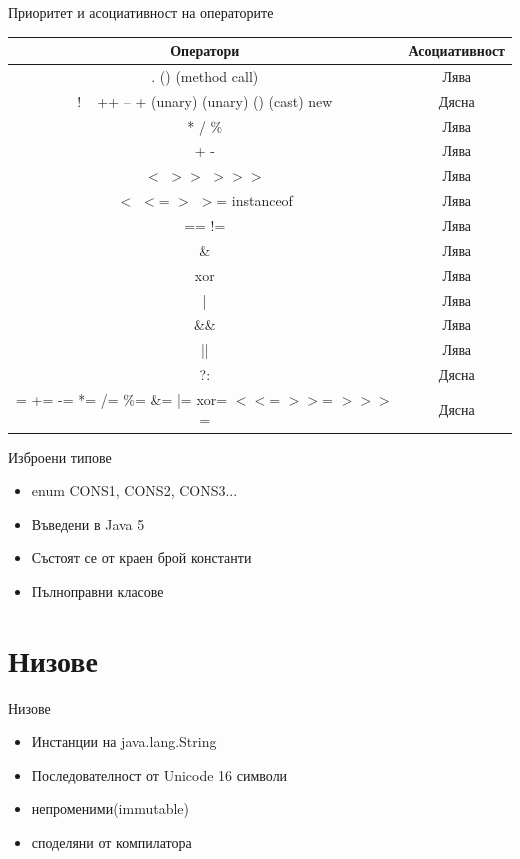 \documentclass{beamer}
\begin{document}
\begin{frame}{Приоритет и асоциативност на операторите}
  \transdissolve
\small
\begin{tabular}{|c|c|}
  \hline
  Оператори & Асоциативност \\
  \hline
  [] . () (method call) & Лява \\
  \hline
  ! ~ ++ -- + (unary) (unary) () (cast) new & Дясна \\
  \hline
  * / \% & Лява \\
  \hline
  + -   & Лява \\
  \hline
  $<$ $>$$>$ $>$$>$$>$ & Лява \\
  \hline
  $<$ $<$= $>$ $>$= instanceof & Лява \\
  \hline
  == != & Лява \\
  \hline
  \& & Лява \\
  \hline
  xor & Лява \\
  \hline
  |                                      & Лява \\
  \hline
  \&\&                                   &  Лява \\
  \hline
  ||                                   &  Лява \\
  \hline
  ?:                                  &   Дясна \\
  \hline
  = += -= *= /= \%= \&= |= xor= $<$$<$= $>$$>$= $>$$>$$>$= & Дясна \\
  \hline
\end{tabular}

\end{frame}

\begin{frame}{Изброени типове}
  \transdissolve
  \begin{itemize}
  \item enum {CONS1, CONS2, CONS3...} \pause
  \item Въведени в Java 5 \pause
  \item Състоят се от краен брой константи \pause
  \item Пълноправни класове 
  \end{itemize}
\end{frame}

\section{Низове}
\begin{frame}{Низове}
  \transdissolve
  \begin{itemize}
  \item Инстанции на java.lang.String \pause
  \item Последователност от Unicode 16 символи \pause
  \item непроменими(immutable) \pause
  \item споделяни от компилатора \pause
  \end{itemize}
\end{frame}
\end{document}
